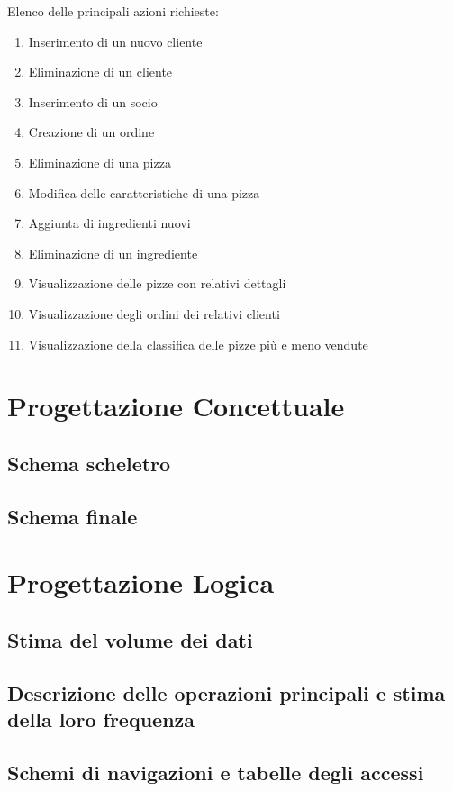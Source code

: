 \documentclass[a4paper,12pt, oneside]{article}
\begin{document}
Elenco delle principali azioni richieste:
\begin{enumerate}
    \item Inserimento di un nuovo cliente
    \item Eliminazione di un cliente
    \item Inserimento di un socio
    \item Creazione di un ordine
    \item Eliminazione di una pizza
    \item Modifica delle caratteristiche di una pizza
    \item Aggiunta di ingredienti nuovi
    \item Eliminazione di un ingrediente
    \item Visualizzazione delle pizze con relativi dettagli
    \item Visualizzazione degli ordini dei relativi clienti
    \item Visualizzazione della classifica delle pizze più e meno vendute
\end{enumerate}

\section{Progettazione Concettuale}
\subsection{Schema scheletro}
\subsection{Schema finale}

\section{Progettazione Logica}
\subsection{Stima del volume dei dati}
\subsection{Descrizione delle operazioni principali e stima della loro frequenza}
\subsection{Schemi di navigazioni e tabelle degli accessi}
\end{document}
